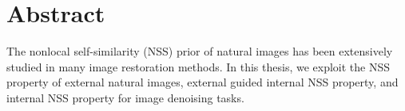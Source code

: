 %
\chapter*{Abstract}
\label{sec:abstract}
\vspace*{-10mm}

The nonlocal self-similarity (NSS) prior of natural images has been extensively studied in many image restoration methods. In this thesis, we exploit the NSS property of external natural images, external guided internal NSS property, and internal NSS property for image denoising tasks.

